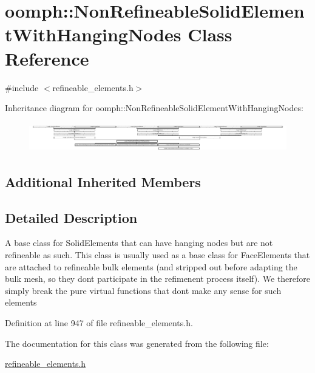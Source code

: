 \hypertarget{classoomph_1_1NonRefineableSolidElementWithHangingNodes}{}\section{oomph\+:\+:Non\+Refineable\+Solid\+Element\+With\+Hanging\+Nodes Class Reference}
\label{classoomph_1_1NonRefineableSolidElementWithHangingNodes}


{\ttfamily \#include $<$refineable\+\_\+elements.\+h$>$}

Inheritance diagram for oomph\+:\+:Non\+Refineable\+Solid\+Element\+With\+Hanging\+Nodes\+:\begin{figure}[H]
\begin{center}
\leavevmode
\includegraphics[height=1.298874cm]{classoomph_1_1NonRefineableSolidElementWithHangingNodes}
\end{center}
\end{figure}
\subsection*{Additional Inherited Members}


\subsection{Detailed Description}
A base class for Solid\+Elements that can have hanging nodes but are not refineable as such. This class is usually used as a base class for Face\+Elements that are attached to refineable bulk elements (and stripped out before adapting the bulk mesh, so they don\textquotesingle{}t participate in the refimenent process itself). We therefore simply break the pure virtual functions that don\textquotesingle{}t make any sense for such elements 

Definition at line 947 of file refineable\+\_\+elements.\+h.



The documentation for this class was generated from the following file\+:\begin{DoxyCompactItemize}
\item 
\hyperlink{refineable__elements_8h}{refineable\+\_\+elements.\+h}\end{DoxyCompactItemize}
